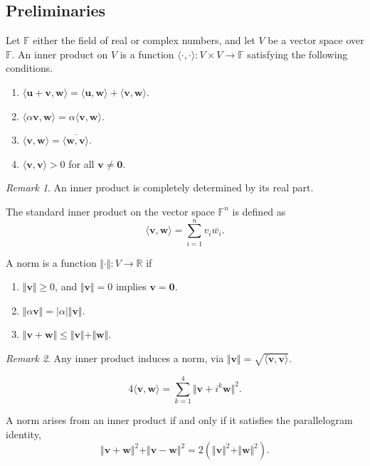 \documentclass[11pt]{article}
\newcommand{\R}{\mathbb{R}}
\newcommand{\F}{\mathbb{F}}
\renewcommand{\vec}[1]{\boldsymbol{#1}}
\newcommand{\vu}{\vec{u}}
\newcommand{\vv}{\vec{v}}
\newcommand{\vw}{\vec{w}}
\newcommand{\ip}[2]{\langle #1, #2 \rangle}
\newcommand{\norm}[1]{\Vert #1 \Vert}
\theoremstyle{definition}
\theoremstyle{remark}
\newtheorem*{remark}{Remark}
\numberwithin{equation}{section}
\begin{document}
    \subsection{Preliminaries}
    \begin{definition}
        Let $\F$ either the field of real or complex numbers, and let $V$ be a vector
        space over $\F$. An inner product on $V$ is a function
        $\ip{\cdot}{\cdot}\colon V \times V \to \F$ satisfying the following
        conditions. \begin{enumerate}
            \itemsep0em
            \item $\ip{\vu + \vv}{\vw} = \ip{\vu}{\vw} + \ip{\vv}{\vw}$.
            \item $\ip{\alpha\vv}{\vw} = \alpha\ip{\vv}{\vw}$.
            \item $\ip{\vv}{\vw} = \overline{\ip{\vw}{\vv}}$.
            \item $\ip{\vv}{\vv} > 0$ for all $\vv \neq \vec{0}$.
        \end{enumerate}
        \begin{remark}
            An inner product is completely determined by its real part.
        \end{remark}
    \end{definition}

    \begin{definition}
        The standard inner product on the vector space $\F^n$ is defined as \[
            \ip{\vv}{\vw} = \sum_{i = 1}^n v_i\overline{w_i}.
        \] 
    \end{definition}

    \begin{definition}
        A norm is a function $\norm{\cdot}\colon V \to \R$ if \begin{enumerate}
            \itemsep0em
            \item $\norm{\vv} \geq 0$, and $\norm{\vv} = 0$ implies $\vv = \vec{0}$.
            \item $\norm{\alpha\vv} = |\alpha|\norm{\vv}$.
            \item $\norm{\vv + \vw} \leq \norm{\vv} + \norm{\vw}$.
        \end{enumerate}
        \begin{remark}
            Any inner product induces a norm, via $\norm{\vv} =
            \sqrt{\ip{\vv}{\vv}}$.
        \end{remark}
    \end{definition}

    \begin{lemma}
        \[
            4\ip{\vv}{\vw} = \sum_{k = 1}^4 \norm{\vv + i^k\vw}^2.
        \] 
    \end{lemma}

    \begin{lemma}
        A norm arises from an inner product if and only if it satisfies the
        parallelogram identity, \[
            \norm{\vv + \vw}^2 + \norm{\vv - \vw}^2 = 2(\norm{\vv}^2 + \norm{\vw}^2).
        \] 
    \end{lemma}
    
\end{document}
